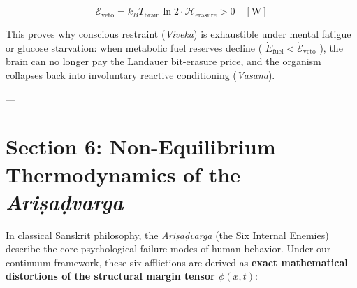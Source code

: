 \documentclass[11pt,a4paper]{article}
\theoremstyle{definition}
\theoremstyle{remark}
\begin{document}
\begin{equation}
\boxed{\dot{\mathcal{E}}_{\text{veto}} = k_B T_{\text{brain}} \ln 2 \cdot \dot{\mathcal{H}}_{\text{erasure}} > 0 \quad [\mathrm{W}]}
\end{equation}


This proves why conscious restraint (\textit{Viveka}) is exhaustible under mental fatigue or glucose starvation: when metabolic fuel reserves decline ( $\dot{E}_{\text{fuel}} < \dot{\mathcal{E}}_{\text{veto}}$ ), the brain can no longer pay the Landauer bit-erasure price, and the organism collapses back into involuntary reactive conditioning (\textit{Vāsanā}).

---

\section{Section 6: Non-Equilibrium Thermodynamics of the \textit{Ariṣaḍvarga}}

In classical Sanskrit philosophy, the \textit{Ariṣaḍvarga} (the Six Internal Enemies) describe the core psychological failure modes of human behavior. Under our continuum framework, these six afflictions are derived as \textbf{exact mathematical distortions of the structural margin tensor $\phi(x, t)$}:
\end{document}
